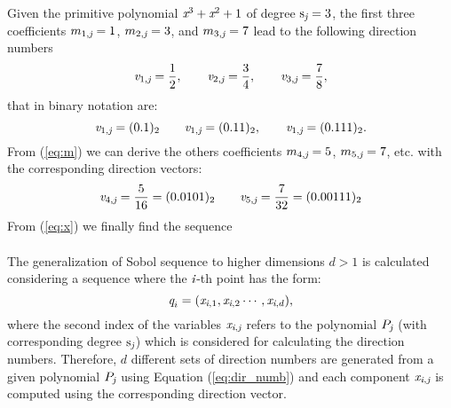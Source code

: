 Given the primitive polynomial $\textit{x}^3+\textit{x}^2+1$ of degree $\textrm{s}_{\textit{j}}=3$, the first three coefficients $m_{1, \textit{j}}=1$, 
$m_{2, \textit{j}}=3$, and $m_{3, \textit{j}}=7$ lead to the following direction numbers 
\begin{equation}
\textit{v}_{1,\textit{j}} = \frac{1}{2}, \qquad \textit{v}_{2,\textit{j}} = \frac{3}{4}, \qquad \textit{v}_{3,\textit{j}}= \frac{7}{8},
\end{equation}
that in binary notation are:
\begin{equation}
\textit{v}_{1,\textit{j}} = (0.1)_2 \qquad \textit{v}_{1,\textit{j}} = (0.11)_2, \qquad \textit{v}_{1,\textit{j}} = (0.111)_2.
\end{equation}
From (\ref{eq:m}) we can derive the others coefficients $m_{4,\textit{j}}=5$, $m_{5,\textit{j}}=7$, etc. with the corresponding direction vectors:
\begin{equation}
\textit{v}_{4,\textit{j}} = \frac{5}{16} = (0.0101)_2  \qquad \textit{v}_{5,\textit{j}} = \frac{7}{32}=(0.00111)_2
\end{equation}
From (\ref{eq:x}) we finally find the sequence
\begin{equation}
\end{equation}
\\ \indent
The generalization of Sobol sequence to higher dimensions $d>1$ is calculated considering a sequence where the $\textit{i}$-th point has the form:
\begin{equation}
\textit{q}_{i} = (\textit{x}_{\textit{i}, 1},\textit{x}_{\textit{i}, 2} \cdots, \textit{x}_{\textit{i}, d}),
\end{equation}
where the second index of the variables $\textit{x}_{\textit{i}, \textit{j}}$ refers to the polynomial $P_{\textit{j}}$ (with corresponding degree $\textrm{s}_{\textit{j}}$) which is considered for calculating the direction numbers. Therefore, $d$ different sets of direction numbers are generated from a given polynomial $P_{\textit{j}}$ using Equation (\ref{eq:dir_numb}) and each component $\textit{x}_{\textit{i},\textit{j}}$ is computed using the corresponding direction vector. 
